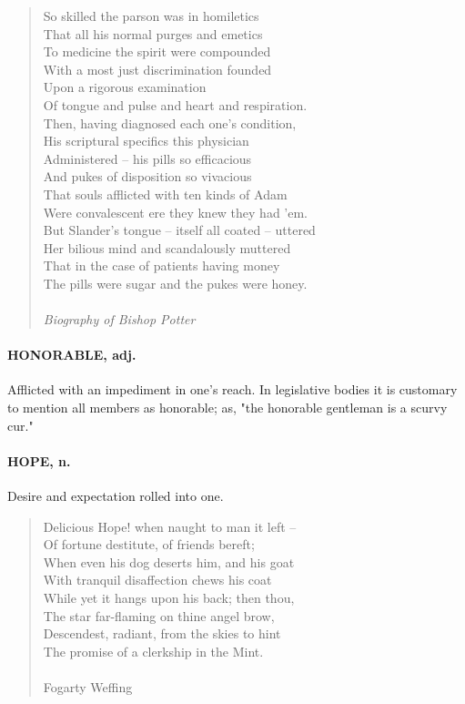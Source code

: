 \documentclass[11pt]{article}
\begin{document}
\begin{quote}   So skilled the parson was in homiletics \\
  That all his normal purges and emetics \\
  To medicine the spirit were compounded \\
  With a most just discrimination founded \\
  Upon a rigorous examination \\
  Of tongue and pulse and heart and respiration. \\
  Then, having diagnosed each one's condition, \\
  His scriptural specifics this physician \\
  Administered -- his pills so efficacious \\
  And pukes of disposition so vivacious \\
  That souls afflicted with ten kinds of Adam \\
  Were convalescent ere they knew they had 'em. \\
  But Slander's tongue -- itself all coated -- uttered \\
  Her bilious mind and scandalously muttered \\
  That in the case of patients having money \\
  The pills were sugar and the pukes were honey. \\
 \\
{\em Biography of Bishop Potter} \end{quote}


\paragraph{HONORABLE, adj.}  Afflicted with an impediment in one's reach.  In
legislative bodies it is customary to mention all members as
honorable; as, "the honorable gentleman is a scurvy cur."

\paragraph{HOPE, n.}  Desire and expectation rolled into one.

\begin{quote}   Delicious Hope! when naught to man it left -- \\
  Of fortune destitute, of friends bereft; \\
  When even his dog deserts him, and his goat \\
  With tranquil disaffection chews his coat \\
  While yet it hangs upon his back; then thou, \\
  The star far-flaming on thine angel brow, \\
  Descendest, radiant, from the skies to hint \\
  The promise of a clerkship in the Mint. \\
 \\
Fogarty Weffing \end{quote}
\end{document}
